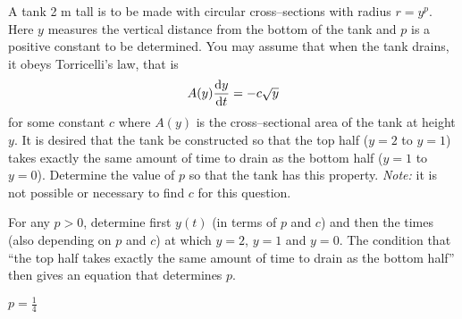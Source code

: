 \begin{question}[2002A]

\end{question}
A tank 2 m tall is to be made with circular cross--sections
with radius $r=y^p$. Here $y$ measures the vertical distance from
the bottom of the tank and $p$ is a positive constant to be
determined. You may assume that when the tank drains, it obeys
Torricelli's law, that is
\begin{align*}
A(y)\diff{y}{t}=-c\sqrt{y}
\end{align*}
for some constant $c$ where $A(y)$ is the cross--sectional area of the
tank at height $y$. It is desired that the tank be constructed so
that the top half
($y=2$ to $y=1$) takes exactly the same amount of time to drain as the
bottom half ($y=1$ to $y=0$). Determine the value of $p$ so that the tank
has this property. \emph{Note:} it is not possible or necessary to find
$c$ for this question.
\begin{hint}
For any $p>0$, determine first $y(t)$ (in terms of $p$ and $c$) and then the times (also depending on $p$ and $c$) at which
$y=2$, $y=1$ and $y=0$. The condition that ``the top half
takes exactly the same amount of time to drain as the
bottom half'' then gives an equation that determines $p$.
\end{hint}

\begin{answer}
$p=\frac{1}{4}$
\end{answer}

